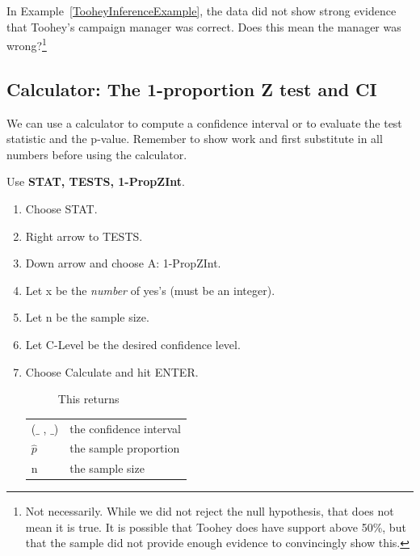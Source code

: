 \begin{exercise}
In Example~\ref{TooheyInferenceExample}, the data did not show strong evidence that Toohey's campaign manager was correct. Does this mean the manager was wrong?\footnote{Not necessarily. While we did not reject the null hypothesis, that does not mean it is true. It is possible that Toohey does have support above 50\%, but that the sample did not provide enough evidence to convincingly show this.}
\end{exercise}


\subsection{Calculator: The 1-proportion Z test and CI\vspace{-3mm}}

We can use a calculator to compute a confidence interval or to evaluate the test statistic and the p-value. Remember to show work and first substitute in all numbers before using the calculator.





\begin{termBox}{
Use \textbf{STAT, TESTS, 1-PropZInt}.
\begin{enumerate}
\setlength{\itemsep}{0mm}
\item Choose STAT.
\item Right arrow to TESTS.
\item Down arrow and choose A: 1-PropZInt.
\item Let x be the \emph{number} of yes's (must be an integer).
\item Let n be the sample size.
\item Let C-Level be the desired confidence level.
\item Choose Calculate and hit ENTER.
\begin{description}
\item[] This returns
\end{description}
\begin{tabular}{l l}
($\_$ , $\_$)
	&\quad  the confidence interval \\
$\hat{p}$
	&\quad	the sample proportion \\
n
	&\quad	the sample size
\end{tabular}
\end{enumerate}
}
\end{termBox}


